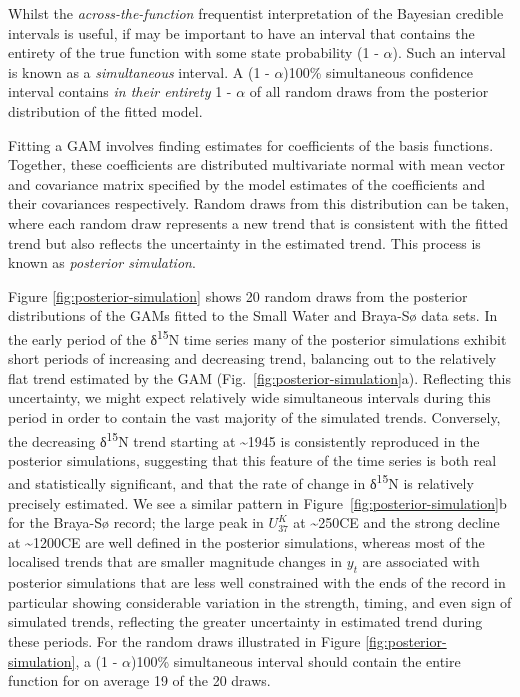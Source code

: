 \documentclass[12pt,]{article}
\newcommand{\uk}{\ensuremath{\mathit{U}^{\mathit{K}}_{\mathup{37}}}}
\begin{document}
Whilst the \emph{across-the-function} frequentist interpretation of the
Bayesian credible intervals is useful, if may be important to have an
interval that contains the entirety of the true function with some state
probability (1 - \(\alpha\)). Such an interval is known as a
\emph{simultaneous} interval. A (1 - \(\alpha\))100\% simultaneous
confidence interval contains \emph{in their entirety} 1 - \(\alpha\) of
all random draws from the posterior distribution of the fitted model.

Fitting a GAM involves finding estimates for coefficients of the basis
functions. Together, these coefficients are distributed multivariate
normal with mean vector and covariance matrix specified by the model
estimates of the coefficients and their covariances respectively. Random
draws from this distribution can be taken, where each random draw
represents a new trend that is consistent with the fitted trend but also
reflects the uncertainty in the estimated trend. This process is known
as \emph{posterior simulation}.

Figure \ref{fig:posterior-simulation} shows 20 random draws from the
posterior distributions of the GAMs fitted to the Small Water and
Braya-Sø data sets. In the early period of the δ\textsuperscript{15}N
time series many of the posterior simulations exhibit short periods of
increasing and decreasing trend, balancing out to the relatively flat
trend estimated by the GAM (Fig.~\ref{fig:posterior-simulation}a).
Reflecting this uncertainty, we might expect relatively wide
simultaneous intervals during this period in order to contain the vast
majority of the simulated trends. Conversely, the decreasing
δ\textsuperscript{15}N trend starting at \textasciitilde{}1945 is
consistently reproduced in the posterior simulations, suggesting that
this feature of the time series is both real and statistically
significant, and that the rate of change in δ\textsuperscript{15}N is
relatively precisely estimated. We see a similar pattern in
Figure~\ref{fig:posterior-simulation}b for the Braya-Sø record; the
large peak in \uk{} at \textasciitilde{}250CE and the strong decline at
\textasciitilde{}1200CE are well defined in the posterior simulations,
whereas most of the localised trends that are smaller magnitude changes
in \(y_t\) are associated with posterior simulations that are less well
constrained with the ends of the record in particular showing
considerable variation in the strength, timing, and even sign of
simulated trends, reflecting the greater uncertainty in estimated trend
during these periods. For the random draws illustrated in Figure
\ref{fig:posterior-simulation}, a (1 - \(\alpha\))100\% simultaneous
interval should contain the entire function for on average 19 of the 20
draws.
\end{document}
